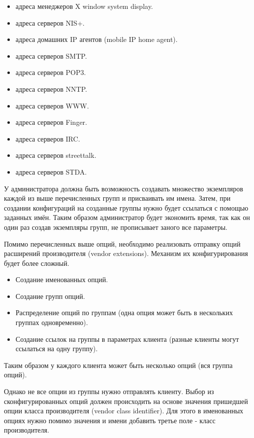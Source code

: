 \documentclass[14pt,a4paper]{extarticle}
\begin{document}
\begin{itemize}
\begin{itemize}
        \item адреса менеджеров X window system display.
        \item адреса серверов NIS+.
        \item адреса домашних IP агентов (mobile IP home agent).
        \item адреса серверов SMTP.
        \item адреса серверов POP3.
        \item адреса серверов NNTP.
        \item адреса серверов WWW.
        \item адреса серверов Finger.
        \item адреса серверов IRC.
        \item адреса серверов streettalk.
        \item адреса серверов STDA.
    \end{itemize}
\end{itemize}

У администратора должна быть возможность создавать множество экземпляров каждой из выше перечисленных групп и присваивать им имена.
Затем, при создании конфигураций на созданные группы нужно будет ссылаться с помощью заданных имён.
Таким образом администратор будет экономить время, так как он один раз создав экземпляры групп, не прописывает заного все параметры.

Помимо перечисленных выше опций, необходимо реализовать отправку опций расширений производителя (vendor extensions).
Механизм их конфигурирования будет более сложный.
\begin{itemize}
    \item Создание именованных опций.
    \item Создание групп опций.
    \item Распределение опций по группам (одна опция может быть в нескольких группах одновременно).
    \item Создание ссылок на группы в параметрах клиента (разные клиенты могут ссылаться на одну группу).
\end{itemize}

Таким образом у каждого клиента может быть несколько опций (вся группа опций).

Однако не все опции из группы нужно отправлять клиенту. Выбор из сконфигурированных опций должен происходить на основе значения пришедшей опции класса производителя (vendor class identifier). Для этого в именованных опциях нужно помимо значения и имени добавить третье поле - класс производителя.
\end{document}
